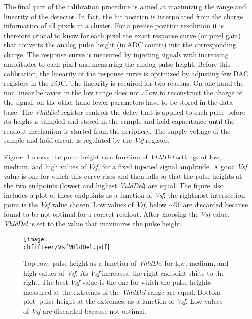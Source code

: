 The final part of the calibration procedure is aimed at maximizing the range and linearity of the detector.
In fact, the hit position is interpolated from the charge information of all pixels in a cluster. For a precise position resolution it is therefore crucial to know for each pixel the exact response curve (or pixel gain) that converts the analog pulse height (in ADC counts) into the corresponding charge.
The response curve is measured by injecting signals with increasing amplitudes to each pixel and measuring the analog pulse height.
Before this calibration, the linearity of the response curve is optimized by adjusting few DAC registers in the ROC.
The linearity is required for two reasons. On one hand the non linear behavior in the low range does not allow to reconstruct the charge of the signal, on the other hand fewer parameters have to be stored in the data base.
The \textit{VhldDel} register controls the delay that is applied to each pulse before its height is sampled and stored in the sample and hold capacitance until the readout mechanism is started from the periphery.
The supply voltage of the sample and hold circuit is regulated by the \textit{Vsf} register.

Figure~\ref{fig:VhldDel} shows the pulse height as a function of \textit{VhldDel} settings at low, medium, and high values of \textit{Vsf}, for a fixed injected signal amplitude.
A good \textit{Vsf} value is one for which this curve rises and then falls so that the pulse heights at the two endpoints (lowest and highest \textit{VhldDel}) are equal.
The figure also includes a plot of these endpoints as a function of \textit{Vsf}; the rightmost intersection point is the \textit{Vsf} value chosen. Low values of \textit{Vsf}, below $\sim 90$ are discarded because found to be not optimal for a correct readout. After choosing the \textit{Vsf} value, \textit{VhldDel} is set to the value that maximizes the pulse height.

\begin{figure}[!htb]
\begin{center}
 \texttt{[image: \\chfifteen/VsfVHldDel.pdf]}
 \end{center}
 \caption{Top row: pulse height as a function of \textit{VhldDel} for low, medium, and high values of \textit{Vsf}. As \textit{Vsf} increases, the right endpoint shifts to the right.
 The best \textit{Vsf} value is the one for which the pulse heights measured at the extremes of the \textit{VhldDel} range are equal.
 Bottom plot: pulse height at the extremes, as a function of \textit{Vsf}. Low values of \textit{Vsf} are discarded because not optimal.}
 \label{fig:VhldDel}
\end{figure}

